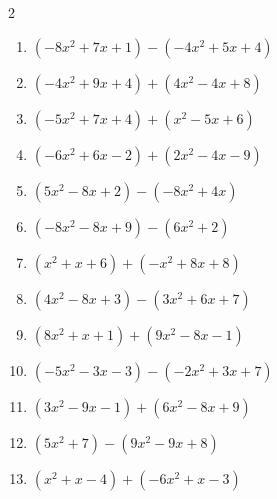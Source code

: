 \begin{multicols}{2}
\begin{enumerate}
  \item $(-8x^{2}+7x+1)-(-4x^{2}+5x+4)$


  \item $(-4x^{2}+9x+4)+(4x^{2}-4x+8)$

        \phantom{$=5x+12$}

  \item $(-5x^{2}+7x+4)+(x^{2}-5x+6)$


  \item $(-6x^{2}+6x-2)+(2x^{2}-4x-9)$


  \item $(5x^{2}-8x+2)-(-8x^{2}+4x)$


  \item $(-8x^{2}-8x+9)-(6x^{2}+2)$


  \item $(x^{2}+x+6)+(-x^{2}+8x+8)$

        \phantom{$=9x+14$}

  \item $(4x^{2}-8x+3)-(3x^{2}+6x+7)$


  \item $(8x^{2}+x+1)+(9x^{2}-8x-1)$


  \item $(-5x^{2}-3x-3)-(-2x^{2}+3x+7)$


  \item $(3x^{2}-9x-1)+(6x^{2}-8x+9)$


  \item $(5x^{2}+7)-(9x^{2}-9x+8)$


  \item $(x^{2}+x-4)+(-6x^{2}+x-3)$


\columnbreak %

\resetques


\end{enumerate}
\end{multicols}
